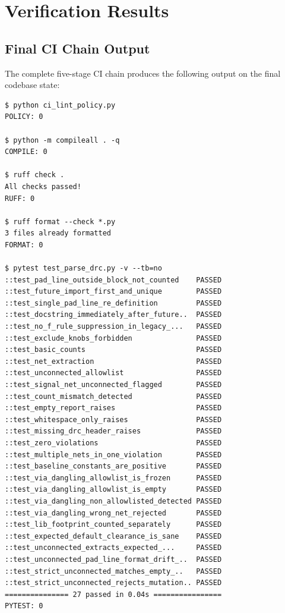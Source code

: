 \documentclass[11pt,a4paper]{article}
\begin{document}
\section{Verification Results}
\label{sec:results}

\subsection{Final CI Chain Output}

The complete five-stage CI chain produces the following output on the final
codebase state:

\begin{lstlisting}[style=shellstyle,caption={Final CI verification output (Feb 26, 2026).},label={lst:results},basicstyle=\ttfamily\scriptsize]
$ python ci_lint_policy.py
POLICY: 0

$ python -m compileall . -q
COMPILE: 0

$ ruff check .
All checks passed!
RUFF: 0

$ ruff format --check *.py
3 files already formatted
FORMAT: 0

$ pytest test_parse_drc.py -v --tb=no
::test_pad_line_outside_block_not_counted    PASSED
::test_future_import_first_and_unique        PASSED
::test_single_pad_line_re_definition         PASSED
::test_docstring_immediately_after_future..  PASSED
::test_no_f_rule_suppression_in_legacy_...   PASSED
::test_exclude_knobs_forbidden               PASSED
::test_basic_counts                          PASSED
::test_net_extraction                        PASSED
::test_unconnected_allowlist                 PASSED
::test_signal_net_unconnected_flagged        PASSED
::test_count_mismatch_detected               PASSED
::test_empty_report_raises                   PASSED
::test_whitespace_only_raises                PASSED
::test_missing_drc_header_raises             PASSED
::test_zero_violations                       PASSED
::test_multiple_nets_in_one_violation        PASSED
::test_baseline_constants_are_positive       PASSED
::test_via_dangling_allowlist_is_frozen      PASSED
::test_via_dangling_allowlist_is_empty       PASSED
::test_via_dangling_non_allowlisted_detected PASSED
::test_via_dangling_wrong_net_rejected       PASSED
::test_lib_footprint_counted_separately      PASSED
::test_expected_default_clearance_is_sane    PASSED
::test_unconnected_extracts_expected_...     PASSED
::test_unconnected_pad_line_format_drift_..  PASSED
::test_strict_unconnected_matches_empty_..   PASSED
::test_strict_unconnected_rejects_mutation.. PASSED
=============== 27 passed in 0.04s ================
PYTEST: 0
\end{lstlisting}
\end{document}
